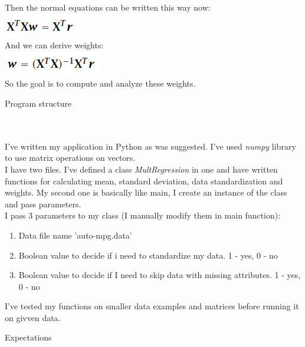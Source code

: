 \documentclass[12pt, letterpaper]{article}
\begin{document}
\begin{enumerate}[label=\Roman*.]
	Then the normal equations can be written this way now: \\
	\includegraphics[scale=0.5]{pics/eq.png} \\
	And we can derive weights: \\
	\includegraphics[scale=0.5]{pics/weights.png} \\
	So the goal is to compute and analyze these weights.
	
	{\bf \item Program structure} \\\\
	I've written my application in Python as was suggested. I've used {\it numpy} library to use matrix operations on vectors. \\
	I have two files.  I've defined a class {\it MultRegression} in one and have written functions for calculating mean, standard deviation, data standardization and weights. My second one is basically like main, I create an instance of the class and pass parameters.\\
	I pass 3 parameters to my class (I manually modify them in main function): 
	\begin{enumerate}[label=\arabic*.]
		\item Data file name 'auto-mpg.data'
		\item Boolean value to decide if i need to standardize my data. 1 - yes, 0 - no
		\item Boolean value to decide if I need to skip data with missing attributes. 1 - yes, 0 - no
	\end{enumerate}
	I've tested my functions on smaller data examples and matrices before running it on givven data.
	
	{\bf \item Expectations} \\
	

\end{enumerate}
\end{document}
